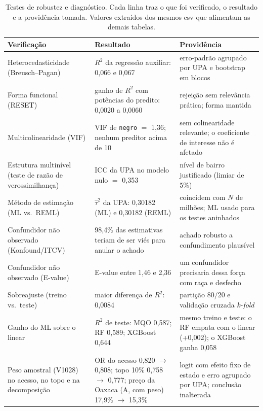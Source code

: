 \begin{table}[!ht]
\centering
\caption{Testes de robustez e diagnóstico. Cada linha traz o que foi
verificado, o resultado e a providência tomada. Valores extraídos dos
mesmos csv que alimentam as demais tabelas.}
\label{tab:robustez}
\small
\begin{tabular}{p{4.1cm}p{5.3cm}p{4.9cm}}
\toprule
Verificação & Resultado & Providência \\
\midrule
Heterocedasticidade (Breusch--Pagan) & $R^2$ da regressão auxiliar: 0{,}066 e 0{,}067 & erro-padrão agrupado por UPA e bootstrap em blocos \\
\addlinespace[2pt]
Forma funcional (RESET) & ganho de $R^2$ com potências do predito: 0{,}0020 a 0{,}0060 & rejeição sem relevância prática; forma mantida \\
\addlinespace[2pt]
Multicolinearidade (VIF) & VIF de \texttt{negro} $=$ 1{,}36; nenhum preditor acima de 10 & sem colinearidade relevante; o coeficiente de interesse não é afetado \\
\addlinespace[2pt]
Estrutura multinível (teste de razão de verossimilhança) & ICC da UPA no modelo nulo $=$ 0{,}353 & nível de bairro justificado (limiar de 5\%) \\
\addlinespace[2pt]
Método de estimação (ML vs.\ REML) & $\hat\tau^2$ da UPA: 0{,}30182 (ML) e 0{,}30182 (REML) & coincidem com $N$ de milhões; ML usado para os testes aninhados \\
\addlinespace[2pt]
Confundidor não observado (Konfound/ITCV) & 98{,}4\% das estimativas teriam de ser viés para anular o achado & achado robusto a confundimento plausível \\
\addlinespace[2pt]
Confundidor não observado (E-value) & E-value entre 1{,}46 e 2{,}36 & um confundidor precisaria dessa força com raça e desfecho \\
\addlinespace[2pt]
Sobreajuste (treino vs.\ teste) & maior diferença de $R^2$: 0{,}0084 & partição 80/20 e validação cruzada $k$-\textit{fold} \\
\addlinespace[2pt]
Ganho do ML sobre o linear & $R^2$ de teste: MQO 0{,}587; RF 0{,}589; XGBoost 0{,}644 & mesmo treino e teste: o RF empata com o linear (+0{,}002); o XGBoost ganha 0{,}058 \\
\addlinespace[2pt]
Peso amostral (V1028) no acesso, no topo e na decomposição & OR do acesso 0{,}820 $\to$ 0{,}808; topo 10\% 0{,}758 $\to$ 0{,}777; preço da Oaxaca (A, com peso) 17{,}9\% $\to$ 15{,}3\% & logit com efeito fixo de estado e erro agrupado por UPA; conclusão inalterada \\

\end{tabular}
\end{table}
